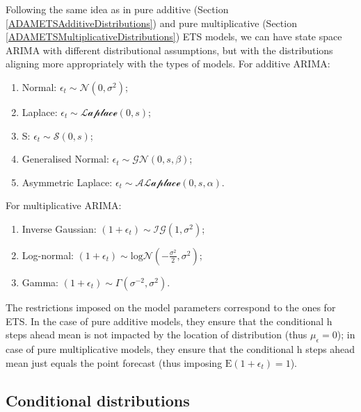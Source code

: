 \documentclass[
]{book}
\providecommand{\tightlist}{%
  \setlength{\itemsep}{0pt}\setlength{\parskip}{0pt}}
\theoremstyle{definition}
\theoremstyle{definition}
\theoremstyle{definition}
\theoremstyle{definition}
\theoremstyle{remark}
\begin{document}
Following the same idea as in pure additive (Section \ref{ADAMETSAdditiveDistributions}) and pure multiplicative (Section \ref{ADAMETSMultiplicativeDistributions}) ETS models, we can have state space ARIMA with different distributional assumptions, but with the distributions aligning more appropriately with the types of models. For additive ARIMA:

\begin{enumerate}
\def\labelenumi{\arabic{enumi}.}
\tightlist
\item
  Normal: \(\epsilon_t \sim \mathcal{N}(0, \sigma^2)\);
\item
  Laplace: \(\epsilon_t \sim \mathcal{Laplace}(0, s)\);
\item
  S: \(\epsilon_t \sim \mathcal{S}(0, s)\);
\item
  Generalised Normal: \(\epsilon_t \sim \mathcal{GN}(0, s, \beta)\);
\item
  Asymmetric Laplace: \(\epsilon_t \sim \mathcal{ALaplace}(0, s, \alpha)\).
\end{enumerate}

For multiplicative ARIMA:

\begin{enumerate}
\def\labelenumi{\arabic{enumi}.}
\tightlist
\item
  Inverse Gaussian: \(\left(1+\epsilon_t \right) \sim \mathcal{IG}(1, \sigma^2)\);
\item
  Log-normal: \(\left(1+\epsilon_t \right) \sim \text{log}\mathcal{N}\left(-\frac{\sigma^2}{2}, \sigma^2\right)\);
\item
  Gamma: \(\left(1+\epsilon_t \right) \sim \mathcal{\Gamma}(\sigma^{-2}, \sigma^2)\).
\end{enumerate}

The restrictions imposed on the model parameters correspond to the ones for ETS. In the case of pure additive models, they ensure that the conditional h steps ahead mean is not impacted by the location of distribution (thus \(\mu_\epsilon=0\)); in case of pure multiplicative models, they ensure that the conditional h steps ahead mean just equals the point forecast (thus imposing \(\mathrm{E}(1+\epsilon_t)=1\)).

\hypertarget{conditional-distributions}{%
\subsection{Conditional distributions}\label{conditional-distributions}}
\end{document}
